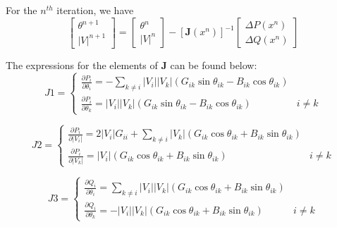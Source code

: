\documentclass[12pt]{article}
\begin{document}
For the $n^{th}$ iteration, we have
\begin{equation}\label{eq:update}
\left [ \begin{array}{c} \theta^{n+1} \\ |V|^{n+1} \end{array} \right ] = \left [ \begin{array}{c} \theta^{n} \\ |V|^{n} \end{array} \right ] -  \left [ \mathbf{J} \left ( x^{n} \right ) \right] ^{-1}  \left [ \begin{array}{c} \Delta P\left ( x^{n} \right ) \\  \Delta Q\left ( x^{n} \right )  \end{array} \right ] 
\end{equation}

The expressions for the elements of $\mathbf{J}$ can be found below:
\begin{equation}\label{eq:J1} 
J1 =\left\{\begin{matrix}

\frac{\partial P_i}{\partial \theta_i} = -\sum_{k\ne i}{|V_i||V_k|\left (G_{ik}\sin\theta_{ik} - B_{ik}\cos\theta_{ik}\right )} &\\
\frac{\partial P_i}{\partial \theta_k} = |V_i||V_k|\left (G_{ik}\sin\theta_{ik} - B_{ik}\cos\theta_{ik}\right )    & i\ne k

\end{matrix}\right .
\end{equation} 


\begin{equation}\label{eq:J2}
J2 =\left\{\begin{matrix}

\frac{\partial P_i}{\partial |V_i|} = 2|V_i|G_{ii} + \sum_{k\ne i}{|V_k|  \left (G_{ik}\cos\theta_{ik} + B_{ik}\sin\theta_{ik}\right )} &\\
\frac{\partial P_i}{\partial |V_k|} = |V_i|\left ( G_{ik}\cos\theta_{ik} +  B_{ik}\sin\theta_{ik}\right )    & i\ne k

\end{matrix}\right  .
\end{equation} 


\begin{equation}\label{eq:J3}
J3 =\left\{\begin{matrix}

\frac{\partial Q_i}{\partial \theta_i} = \sum_{k\ne i}{|V_i||V_k|\left (G_{ik}\cos\theta_{ik} + B_{ik}\sin\theta_{ik}\right )} &\\
\frac{\partial Q_i}{\partial \theta_k} = -|V_i||V_k|\left (G_{ik}\cos\theta_{ik} + B_{ik}\sin\theta_{ik}\right )    & i\ne k

\end{matrix}\right .
\end{equation} 
\end{document}
